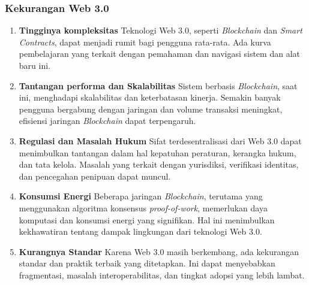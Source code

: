 \documentclass[a4paper]{article}
\begin{document}
\subsubsection{Kekurangan Web 3.0}

\begin{enumerate}
      \item {
            \raggedleft\textbf{Tingginya kompleksitas}
            \linebreak
            \justifying
            Teknologi Web 3.0, seperti \textit{Blockchain} dan \textit{Smart
                  Contracts}, dapat menjadi rumit bagi pengguna rata-rata. Ada kurva
            pembelajaran yang terkait dengan pemahaman dan navigasi sistem dan
            alat baru ini.
            }

      \item {
            \raggedleft\textbf{Tantangan performa dan Skalabilitas}
            \linebreak
            \justifying
            Sistem berbasis \textit{Blockchain}, saat ini, menghadapi
            skalabilitas dan keterbatasan kinerja. Semakin banyak pengguna
            bergabung dengan jaringan dan volume transaksi meningkat, efisiensi
            jaringan \textit{Blockchain} dapat terpengaruh.
            }

      \item {
            \raggedleft\textbf{Regulasi dan Masalah Hukum}
            \linebreak
            \justifying
            Sifat terdesentralisasi dari Web 3.0 dapat menimbulkan tantangan
            dalam hal kepatuhan peraturan, kerangka hukum, dan tata kelola.
            Masalah yang terkait dengan yurisdiksi, verifikasi identitas, dan
            pencegahan penipuan dapat muncul.
            }

      \item {
            \raggedleft\textbf{Konsumsi Energi}
            \linebreak
            \justifying
            Beberapa jaringan \textit{Blockchain}, terutama yang menggunakan
            algoritma konsensus \textit{proof-of-work}, memerlukan daya
            komputasi dan konsumsi energi yang signifikan. Hal ini menimbulkan
            kekhawatiran tentang dampak lingkungan dari teknologi Web 3.0.
            }

      \item {
            \raggedleft\textbf{Kurangnya Standar}
            \linebreak
            \justifying
            Karena Web 3.0 masih berkembang, ada kekurangan standar dan praktik
            terbaik yang ditetapkan. Ini dapat menyebabkan fragmentasi, masalah
            interoperabilitas, dan tingkat adopsi yang lebih lambat.

            }
\end{enumerate}
\end{document}
